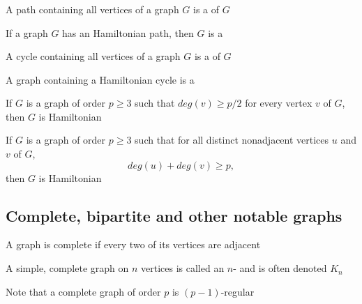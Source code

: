 \documentclass[aspectratio=43]{beamer}
\begin{document}
\begin{frame}\frametitle{}
\begin{definition}
	A path containing all vertices of a graph $G$ is a  of $G$
\end{definition}
\vfill
\begin{definition}
	If a graph $G$ has an Hamiltonian path, then $G$ is a 
\end{definition}
\vfill
\begin{definition}
	A cycle containing all vertices of a graph $G$ is a  of $G$
\end{definition}
\vfill
\begin{definition}
	A graph containing a Hamiltonian cycle is a 
\end{definition}
\end{frame}

\begin{frame}
\begin{theorem}
	If $G$ is a graph of order $p\geq 3$ such that $deg(v)\geq p/2$ for every vertex $v$ of $G$, then $G$ is Hamiltonian
\end{theorem}
\vfill
\begin{theorem}
	If $G$ is a graph of order $p\geq 3$ such that for all distinct nonadjacent vertices $u$ and $v$ of $G$, $$deg(u)+deg(v)\geq p,$$ 
	then $G$ is Hamiltonian
\end{theorem}
\end{frame}

\subsection{Complete, bipartite and other notable graphs}
\begin{frame}
\begin{definition}
A graph is complete if every two of its vertices are adjacent
\end{definition}
\vfill
\begin{definition}[$n$-clique]
	A simple, complete graph on $n$ vertices is called an $n$- and is often denoted $K_n$
\end{definition}
\vfill
Note that a complete graph of order $p$ is $(p-1)$-regular
\end{frame}
\end{document}
